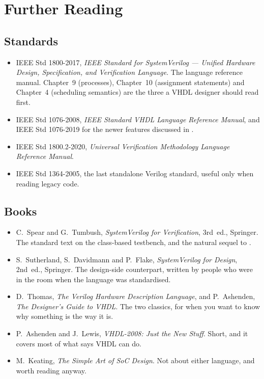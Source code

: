 \cleardoublepage
{}
{}
\chapter*{Further Reading}

\section*{Standards}

\begin{itemize}
  \item IEEE Std 1800-2017, \emph{IEEE Standard for SystemVerilog --- Unified
        Hardware Design, Specification, and Verification Language}. The
        language reference manual. Chapter~9 (processes), Chapter~10
        (assignment statements) and Chapter~4 (scheduling semantics) are the
        three a VHDL designer should read first.
  \item IEEE Std 1076-2008, \emph{IEEE Standard VHDL Language Reference
        Manual}, and IEEE Std 1076-2019 for the newer features discussed in
        .
  \item IEEE Std 1800.2-2020, \emph{Universal Verification Methodology
        Language Reference Manual}.
  \item IEEE Std 1364-2005, the last standalone Verilog standard, useful only
        when reading legacy code.
\end{itemize}

\section*{Books}

\begin{itemize}
  \item C.~Spear and G.~Tumbush, \emph{SystemVerilog for Verification},
        3rd~ed., Springer. The standard text on the class-based testbench,
        and the natural sequel to .
  \item S.~Sutherland, S.~Davidmann and P.~Flake, \emph{SystemVerilog for
        Design}, 2nd~ed., Springer. The design-side counterpart, written by
        people who were in the room when the language was standardised.
  \item D.~Thomas, \emph{The Verilog Hardware Description Language}, and
        P.~Ashenden, \emph{The Designer's Guide to VHDL}. The two classics,
        for when you want to know why something is the way it is.
  \item P.~Ashenden and J.~Lewis, \emph{VHDL-2008: Just the New Stuff}.
        Short, and it covers most of what  says VHDL can do.
  \item M.~Keating, \emph{The Simple Art of SoC Design}. Not about either
        language, and worth reading anyway.
\end{itemize}

